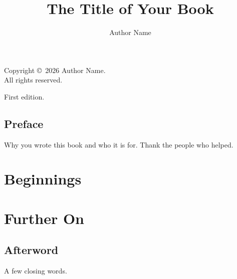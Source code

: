\documentclass[11pt,openany]{book}  %
\title{The Title of Your Book}
\author{Author Name}
\date{}
\begin{document}
\frontmatter
\maketitle

\thispagestyle{empty}
\vspace*{\fill}
\noindent Copyright \copyright\ 2026 Author Name.\\
All rights reserved. %
\par\medskip
\noindent First edition.
\clearpage

\chapter{Preface}
Why you wrote this book and who it is for. Thank the people who helped.

\tableofcontents

\mainmatter
\part{Beginnings}



\part{Further On}


\backmatter
\chapter{Afterword}
A few closing words.
\end{document}
